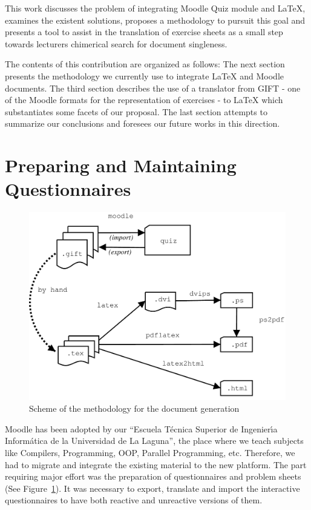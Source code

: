 \documentclass{pracjourn}[2006/02/20]
\begin{document}
This work discusses the problem of integrating Moodle Quiz module and \LaTeX, 
examines the existent solutions,
proposes a methodology to pursuit this goal and presents a tool to assist 
in the translation of exercise sheets as a small step towards
lecturers chimerical search for document singleness.

The contents of this contribution are organized as follows:
The next section presents the methodology we currently use 
to integrate \LaTeX{} and Moodle documents.
The third section describes the use of a translator
from \textsc{GIFT} - one of the Moodle formats for the representation
of exercises - to \LaTeX{} which substantiates some
facets of our proposal. The last section attempts to 
summarize our conclusions and foresees our future works
in this direction.

\section{Preparing and Maintaining Questionnaires}
\label{section:met}
%

\begin{figure}[tb]
\begin{center}
    \includegraphics[scale=0.3]{methodology}
    \caption{Scheme of the methodology for the document generation}
    \label{fig:metogen}
  \end{center}
\end{figure}

%
Moodle has been adopted by our ``Escuela
T\'ecnica Superior de Ingenier\'{\i}a Inform\'atica de la Universidad de
La Laguna'', the place where we teach \cite{url:est} subjects
like Compilers, Programming, OOP, Parallel Programming, etc. 
Therefore, we had to migrate and integrate the existing material 
to the new platform.
The part requiring major effort was the 
preparation of questionnaires and problem sheets
(See Figure~\ref{fig:metogen}).
It was necessary to export, translate and import 
the interactive questionnaires 
to have both reactive and unreactive versions
of them.  
\end{document}
